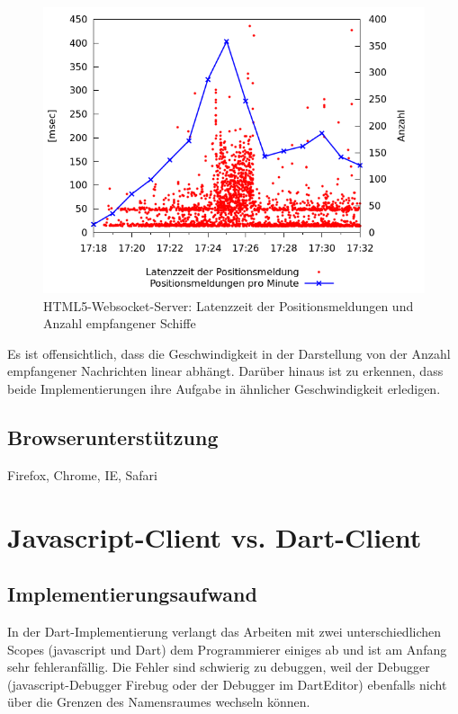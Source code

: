 \begin {figure}[H]
\begin{center}
  \includegraphics[width=4.5in]{images/latency_timeReceived_HTML5.png}
\end{center}
\caption{HTML5-Websocket-Server: Latenzzeit der Positionsmeldungen und Anzahl empfangener Schiffe}
\label {Latenzzeit HTML5}
\end {figure}
Es ist offensichtlich, dass die Geschwindigkeit in der Darstellung von der Anzahl empfangener Nachrichten linear abhängt.
Darüber hinaus ist zu erkennen, dass beide Implementierungen ihre Aufgabe in ähnlicher Geschwindigkeit erledigen. 

\subsection{Browserunterstützung}
Firefox, Chrome, IE, Safari


\section{Javascript-Client vs. Dart-Client} 
\subsection{Implementierungsaufwand}
In der Dart-Implementierung verlangt das Arbeiten mit zwei unterschiedlichen Scopes (javascript und Dart) dem Programmierer einiges ab und ist am Anfang sehr fehleranfällig. Die Fehler sind schwierig zu debuggen, weil der Debugger (javascript-Debugger Firebug oder der Debugger im DartEditor) ebenfalls nicht über die Grenzen des Namensraumes wechseln können. 

